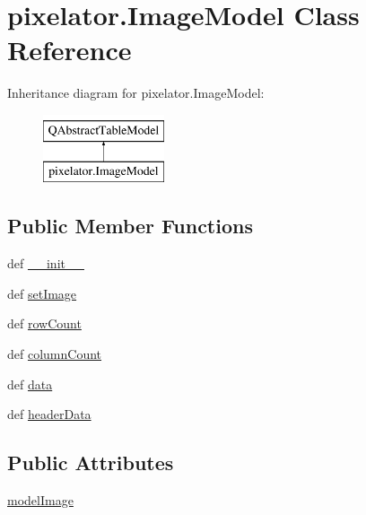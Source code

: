 \hypertarget{classpixelator_1_1ImageModel}{}\section{pixelator.\+Image\+Model Class Reference}
\label{classpixelator_1_1ImageModel}
Inheritance diagram for pixelator.\+Image\+Model\+:\begin{figure}[H]
\begin{center}
\leavevmode
\includegraphics[height=2.000000cm]{classpixelator_1_1ImageModel}
\end{center}
\end{figure}
\subsection*{Public Member Functions}
\begin{DoxyCompactItemize}
\item 
def \hyperlink{classpixelator_1_1ImageModel_a08ae93c3cc5ea763327b4f8625573d30}{\+\_\+\+\_\+init\+\_\+\+\_\+}
\item 
def \hyperlink{classpixelator_1_1ImageModel_a8dfadc4ae7068603483374265a9948b2}{set\+Image}
\item 
def \hyperlink{classpixelator_1_1ImageModel_a25daa76baaaa66aee8a25e307fb69065}{row\+Count}
\item 
def \hyperlink{classpixelator_1_1ImageModel_a7f0dcac77c02cd7920d3ebabd5e08e62}{column\+Count}
\item 
def \hyperlink{classpixelator_1_1ImageModel_a3fe28f44688775108c57677b7bf70259}{data}
\item 
def \hyperlink{classpixelator_1_1ImageModel_aadffcab0b537233c2080ab73823ae91c}{header\+Data}
\end{DoxyCompactItemize}
\subsection*{Public Attributes}
\begin{DoxyCompactItemize}
\item 
\hyperlink{classpixelator_1_1ImageModel_a48cd074235626417f6542cd32963329b}{model\+Image}
\end{DoxyCompactItemize}


